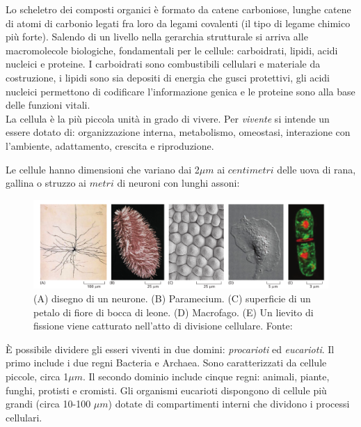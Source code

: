 \par Lo scheletro dei composti organici è formato da catene carboniose, lunghe catene di atomi di carbonio legati fra loro da legami covalenti (il tipo di legame chimico più forte). Salendo di un livello nella gerarchia strutturale si arriva alle macromolecole biologiche, fondamentali per le cellule: carboidrati, lipidi, acidi nucleici e proteine. I carboidrati sono combustibili cellulari e materiale da costruzione, i lipidi sono sia depositi di energia che gusci protettivi, gli acidi nucleici permettono di codificare l'informazione genica e le proteine sono alla base delle funzioni vitali.\\

La cellula è la più piccola unità in grado di vivere. Per \textit{vivente} si intende un essere dotato di: organizzazione interna, metabolismo, omeostasi, interazione con l'ambiente, adattamento, crescita e riproduzione.

\par Le cellule hanno dimensioni che variano dai 2$\mu m$ ai $centimetri$ delle uova di rana, gallina o struzzo ai $metri$ di neuroni con lunghi assoni:

\begin{figure}[!h]
	\centering
	\includegraphics[scale=0.5] {images/cellule-dimensioni.png}
	\caption{(A) disegno di un neurone. (B) Paramecium. (C) superficie di un petalo di fiore di bocca di leone. (D) Macrofago. (E) Un lievito di fissione viene catturato nell'atto di divisione cellulare. Fonte: \cite{alberts2018essential}}
	\label{fig:cellule-dimensioni}
\end{figure}

\par È possibile dividere gli esseri viventi in due domini: \textit{procarioti} ed \textit{eucarioti}. Il primo include i due regni Bacteria e Archaea. Sono caratterizzati da cellule piccole, circa 1$\mu m$. Il secondo dominio include cinque regni: animali, piante, funghi, protisti e cromisti. Gli organismi eucarioti dispongono di cellule più grandi (circa 10-100 $\mu m$) dotate di compartimenti interni che dividono i processi cellulari.

